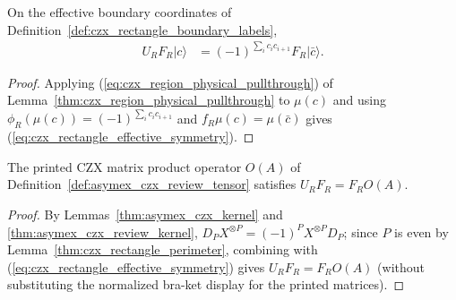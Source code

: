 \begin{lemma}%
    \label{thm:czx_rectangle_effective_symmetry}
    \leanok
    On the effective boundary coordinates of
    Definition~\ref{def:czx_rectangle_boundary_labels},
    \begin{align}
        U_RF_R|c\rangle
         & =(-1)^{\sum_i c_ic_{i+1}}F_R|\bar c\rangle.
        \label{eq:czx_rectangle_effective_symmetry}
    \end{align}
\end{lemma}
\begin{proof}\leanok
    Applying (\ref{eq:czx_region_physical_pullthrough}) of
    Lemma~\ref{thm:czx_region_physical_pullthrough} to $\mu(c)$ and using
    $\phi_R(\mu(c))=(-1)^{\sum_i c_ic_{i+1}}$ and $f_R\mu(c)=\mu(\bar c)$ gives
    (\ref{eq:czx_rectangle_effective_symmetry}).
\end{proof}

\begin{lemma}%
    \label{thm:czx_rectangle_review_mpo}
    \leanok
    The printed CZX matrix product operator $O(A)$ of
    Definition~\ref{def:asymex_czx_review_tensor} satisfies $U_RF_R=F_RO(A)$.
\end{lemma}
\begin{proof}\leanok
    By Lemmas~\ref{thm:asymex_czx_kernel} and
    \ref{thm:asymex_czx_review_kernel}, $D_PX^{\otimes P}=(-1)^PX^{\otimes P}D_P$;
    since $P$ is even by Lemma~\ref{thm:czx_rectangle_perimeter}, combining
    with (\ref{eq:czx_rectangle_effective_symmetry}) gives $U_RF_R=F_RO(A)$
    (without substituting the normalized bra-ket display for the printed matrices).
\end{proof}

